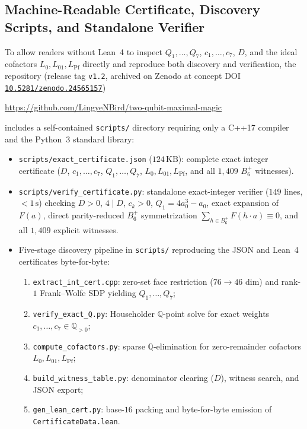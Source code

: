 \documentclass[11pt,a4paper]{article}
\theoremstyle{plain}
\theoremstyle{definition}
\theoremstyle{remark}
\newcommand{\Q}{\mathbb{Q}}
\newcommand{\Bplus}{B_6^+}
\newcommand{\code}[1]{\texttt{\small #1}}
\begin{document}
\subsection{Machine-Readable Certificate, Discovery Scripts, and Standalone Verifier}
To allow readers without Lean~4 to inspect $Q_1, \dots, Q_7$, $c_1, \dots, c_7$, $D$, and the ideal cofactors $L_0, L_{01}, L_{\mathrm{Pf}}$ directly and reproduce both discovery and verification, the repository (release tag \code{v1.2}, archived on Zenodo at concept DOI \href{https://doi.org/10.5281/zenodo.24565157}{\code{10.5281/zenodo.24565157}})
\begin{center}
  \url{https://github.com/LingyeNBird/two-qubit-maximal-magic}
\end{center}
includes a self-contained \code{scripts/} directory requiring only a C++17 compiler and the Python~3 standard library:
\begin{itemize}[leftmargin=1.8em, itemsep=2pt]
  \item \code{scripts/exact\_certificate.json} ($124\,\mathrm{KB}$): complete exact integer certificate ($D$, $c_1,\dots,c_7$, $Q_1,\dots,Q_7$, $L_0, L_{01}, L_{\mathrm{Pf}}$, and all $1{,}409$ $\Bplus$ witnesses).
  \item \code{scripts/verify\_certificate.py}: standalone exact-integer verifier ($149$ lines, $< 1\,\mathrm{s}$) checking $D > 0$, $4\mid D$, $c_k > 0$, $Q_1 = 4a_0^3 - a_0$, exact expansion of $F(a)$, direct parity-reduced $\Bplus$ symmetrization $\sum_{h\in\Bplus} F(h\cdot a) \equiv 0$, and all $1{,}409$ explicit witnesses.
  \item Five-stage discovery pipeline in \code{scripts/} reproducing the JSON and Lean~4 certificates byte-for-byte:
  \begin{enumerate}[label=\arabic*., leftmargin=1.6em, itemsep=1pt, topsep=2pt]
    \item \code{extract\_int\_cert.cpp}: zero-set face restriction ($76 \to 46$ dim) and rank-$1$ Frank--Wolfe SDP yielding $Q_1, \dots, Q_7$;
    \item \code{verify\_exact\_Q.py}: Householder $\Q$-point solve for exact weights $c_1, \dots, c_7 \in \Q_{>0}$;
    \item \code{compute\_cofactors.py}: sparse $\Q$-elimination for zero-remainder cofactors $L_0, L_{01}, L_{\mathrm{Pf}}$;
    \item \code{build\_witness\_table.py}: denominator clearing ($D$), witness search, and JSON export;
    \item \code{gen\_lean\_cert.py}: base-$16$ packing and byte-for-byte emission of \code{CertificateData.lean}.
  \end{enumerate}
\end{itemize}
\end{document}
